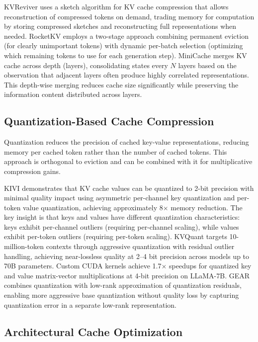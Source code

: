 \documentclass[11pt,letterpaper]{article}
\begin{document}
KVReviver uses a sketch algorithm for KV cache compression that allows reconstruction of compressed tokens on demand, trading memory for computation by storing compressed sketches and reconstructing full representations when needed. RocketKV employs a two-stage approach combining permanent eviction (for clearly unimportant tokens) with dynamic per-batch selection (optimizing which remaining tokens to use for each generation step). MiniCache \cite{jia2024minicache} merges KV cache across depth (layers), consolidating states every $N$ layers based on the observation that adjacent layers often produce highly correlated representations. This depth-wise merging reduces cache size significantly while preserving the information content distributed across layers.

\subsection{Quantization-Based Cache Compression}

Quantization reduces the precision of cached key-value representations, reducing memory per cached token rather than the number of cached tokens. This approach is orthogonal to eviction and can be combined with it for multiplicative compression gains.

KIVI \cite{liu2024kivi} demonstrates that KV cache values can be quantized to 2-bit precision with minimal quality impact using asymmetric per-channel key quantization and per-token value quantization, achieving approximately 8$\times$ memory reduction. The key insight is that keys and values have different quantization characteristics: keys exhibit per-channel outliers (requiring per-channel scaling), while values exhibit per-token outliers (requiring per-token scaling). KVQuant \cite{hooper2024kvquant} targets 10-million-token contexts through aggressive quantization with residual outlier handling, achieving near-lossless quality at 2--4 bit precision across models up to 70B parameters. Custom CUDA kernels achieve 1.7$\times$ speedups for quantized key and value matrix-vector multiplications at 4-bit precision on LLaMA-7B. GEAR \cite{kang2024gear} combines quantization with low-rank approximation of quantization residuals, enabling more aggressive base quantization without quality loss by capturing quantization error in a separate low-rank representation.

\subsection{Architectural Cache Optimization}
\end{document}
